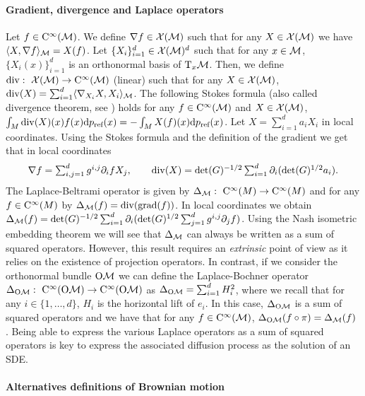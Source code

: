 \paragraph{Gradient, divergence and Laplace operators}
Let $f \in \mathrm{C}^{\infty}(\mathcal M)$. We define $\nabla f \in \mathcal{X}(\mathcal{M})$ such that for any
$X \in \mathcal{X}(\mathcal{M})$ we have $\langle X, \nabla f \rangle_{\mathcal M} = X(f)$. Let
$\{X_i\}_{i=1}^d \in \mathcal{X}(\mathcal{M})^d$ such that for any $x \in \mathcal M$, $\{X_i(x)\}_{i=1}^d$
is an orthonormal basis of $\mathrm{T}_x \mathcal M$. Then, we define
$\mathrm{div}: \ \mathcal{X}(\mathcal{M}) \to \mathrm{C}^\infty(\mathcal M)$ (linear) 
such that for any $X \in \mathcal{X}(\mathcal{M})$,
$\mathrm{div}(X) = \sum_{i=1}^d \langle \nabla_{X_i}X, X_i \rangle_\mathcal M$. The following Stokes
formula (also called divergence theorem, see \citet[p.51]{lee2018introduction})
holds for any $f \in \mathrm{C}^\infty(\mathcal M)$ and $X \in \mathcal{X}(\mathcal{M})$,
$\int_{M} \mathrm{div}(X)(x) f(x) \mathrm{d} p_{\textup{ref}}(x) = - \int_M X(f)(x) \mathrm{d}
p_{\textup{ref}}(x)$. Let $X = \sum_{i=1}^d a_i X_i$ in local coordinates.  Using the
Stokes formula and the definition of the gradient we get that in local
coordinates
\begin{equation}
\textstyle{  \nabla f = \sum_{i,j=1}^d g^{i,j} \partial_i f X_j  ,  \qquad \mathrm{div}(X) = \det(G)^{-1/2} \sum_{i=1}^d \partial_i(\det(G)^{1/2} a_i)  . }
\end{equation}
The Laplace-Beltrami operator is given by 
$\Delta_{\M} : \ \rmc^\infty(M) \to \rmc^\infty(M)$ and for any
$f \in \mathrm{C}^\infty(M)$ by $\Delta_{\mathcal M}(f) = \mathrm{div}(\mathrm{grad}(f))$. In local
coordinates we obtain 
$\Delta_{\mathcal M}(f) = \det(G)^{-1/2} \sum_{i=1}^d \partial_i (\det(G)^{1/2}
\sum_{j=1}^d g^{i,j} \partial_j f)$. Using the Nash isometric embedding theorem
\citep{gunther1991isometric} we will see that $\Delta_{\mathcal M}$ can always be
written as a sum of squared operators. However, this result requires an
\emph{extrinsic} point of view as it relies on the existence of projection
operators. In contrast, if we consider the orthonormal bundle $\mathrm{O}\mathcal{M}$ we can
define the Laplace-Bochner operator
$\Delta_{\mathrm{O}\mathcal{M}}: \ \mathrm{C}^\infty(\mathrm{O}\mathcal{M}) \to \mathrm{C}^\infty(\mathrm{O}\mathcal{M})$ as
$\Delta_{\mathrm{O}\mathcal{M}} = \sum_{i=1}^d H_i^2$, where we recall that for any
$i \in \{1, \dots, d\}$, $H_i$ is the horizontal lift of $e_i$. In this case,
$\Delta_{\mathrm{O}\mathcal{M}}$ is a sum of squared operators and we have that for any
$f \in \mathrm{C}^\infty(\mathcal M)$, $\Delta_{\mathrm{O}\mathcal{M}}(f \circ \pi) = \Delta_{\mathcal M}(f)$
\cite[see][Proposition 3.1.2]{hsu2002stochastic}. Being able to express the various
Laplace operators as a sum of squared operators is key to express the associated
diffusion process as the solution of an SDE.

\paragraph{Alternatives definitions of Brownian motion}

